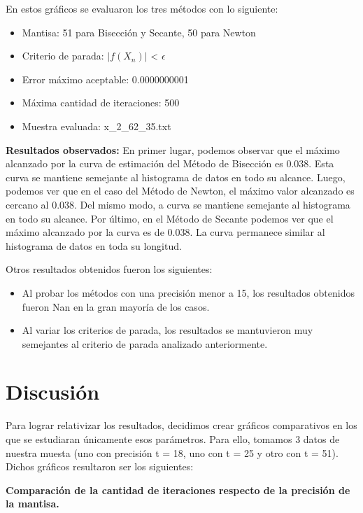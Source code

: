 \documentclass[10pt, a4paper]{article}
\begin{document}
En estos gr\'aficos se evaluaron los tres m\'etodos con lo siguiente:
\begin{itemize}
\item Mantisa: 51 para Bisecci\'on y Secante, 50 para Newton
\item Criterio de parada: $|f(X_{n})|$ < $\epsilon$ 
\item Error m\'aximo aceptable: 0.0000000001
\item M\'axima cantidad de iteraciones: 500
\item Muestra evaluada: x\_2\_62\_35.txt
\end{itemize}

\large{\textbf{Resultados observados:}} En primer lugar, podemos observar que el m\'aximo alcanzado por la curva de estimaci\'on del M\'etodo de Bisecci\'on es 0.038. Esta curva se mantiene semejante al histograma de datos en todo su alcance. Luego, podemos ver que en el caso del M\'etodo de Newton, el m\'aximo valor alcanzado es cercano al 0.038. Del mismo modo, a curva se mantiene semejante al histograma en todo su alcance. Por \'ultimo, en el M\'etodo de Secante podemos ver que el m\'aximo alcanzado por la curva es de 0.038. La curva permanece similar al histograma de datos en toda su longitud.\newline

Otros resultados obtenidos fueron los siguientes:
\begin{itemize}
\item Al probar los m\'etodos con una precisi\'on menor a 15, los resultados obtenidos fueron Nan en la gran mayor\'ia de los casos.
\item Al variar los criterios de parada, los resultados se mantuvieron muy semejantes al criterio de parada analizado anteriormente.
\end{itemize}
\section{Discusi\'on}

Para lograr relativizar los resultados, decidimos crear gr\'aficos comparativos en los que se estudiaran \'unicamente esos par\'ametros. Para ello, tomamos 3 datos de nuestra muesta (uno con precisi\'on t = 18, uno con t = 25 y otro con t = 51). Dichos gr\'aficos resultaron ser los siguientes:\newline

\large{\textbf{Comparaci\'on de la cantidad de iteraciones respecto de la precisi\'on de la mantisa.}}\newline
\end{document}
